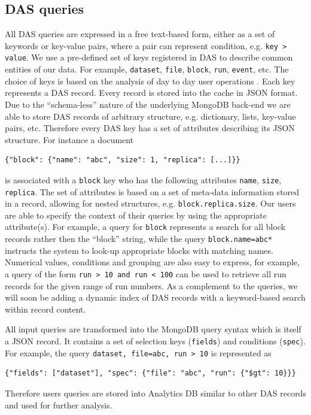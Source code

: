 \documentclass[3p,times]{elsarticle}
\begin{document}
\subsection{DAS queries}
All DAS queries are expressed in a free text-based form, either as a 
set of keywords or key-value pairs, where a pair can represent
condition, e.g. \verb+key > value+. We use a pre-defined set of keys registered 
in DAS to describe common entities of our data. For example, \verb+dataset+, 
\verb+file+, \verb+block+, \verb+run+, \verb+event+, etc. The choice of keys
is based on the analysis of day to day user operations \cite{DBS07}.
Each key represents a DAS record. Every record is stored into the cache
in JSON format. Due to the ``schema-less'' nature of the underlying MongoDB
back-end we are able to store DAS records of arbitrary structure, e.g.
dictionary, lists, key-value pairs, etc. Therefore every DAS key has a 
set of attributes describing its JSON structure. For instance a document
\begin{verbatim}
{"block": {"name": "abc", "size": 1, "replica": [...]}}
\end{verbatim}
is associated with a \verb+block+ key who has the following attributes
\verb+name+, \verb+size+, \verb+replica+. The set of attributes is based 
on a set of meta-data information stored in a record, allowing
for nested structures, e.g. \verb+block.replica.size+. Our users 
are able to specify the context of their queries by using the appropriate 
attribute(s). For example, a query for \verb+block+ represents a search for all
block records rather then the ``block'' string, while the query
\verb+block.name=abc*+ instructs the system to look-up appropriate blocks
with matching names. Numerical values, conditions and grouping are
also easy to express, for example, a query
of the form \verb+run > 10 and run < 100+ can be used to
retrieve all run records for the given range of run numbers. 
As a complement to the queries, we will soon be adding a dynamic index
of DAS records with a keyword-based search within record content.

All input queries are transformed into the MongoDB query syntax which is itself
a JSON record. It contains a set of selection 
keys (\verb+fields+) and conditions (\verb+spec+). For example, the query
\verb+dataset, file=abc, run > 10+
is represented as
\begin{verbatim}
{"fields": ["dataset"], "spec": {"file": "abc", "run": {"$gt": 10}}}
\end{verbatim}
Therefore users queries are stored into Analytics DB similar to other DAS 
records and used for further analysis.
\end{document}
